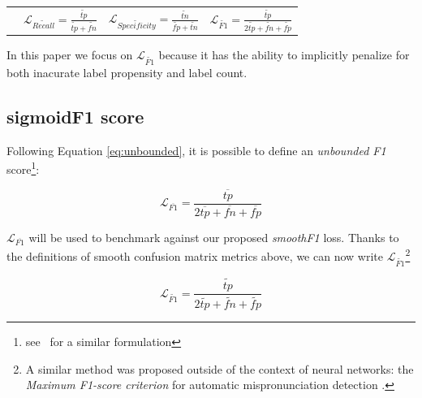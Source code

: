 \begin{table}[]
\begin{tabular}{|c||c|c||c|}
\multicolumn{1}{l|}{} & \multirow{2}{*}{\hspace{1.2em}$\mathcal{L}_{\widetilde{\mathit{Recall}}}= \frac{\widetilde{\mathit{tp}}}{\widetilde{\mathit{tp}} + \widetilde{\mathit{fn}}}$\hspace{1.2em}}& \multirow{2}{*}{$\mathcal{L}_{\widetilde{\mathit{Specificity}}}= \frac{\widetilde{\mathit{tn}}}{\widetilde{\mathit{fp}} + \widetilde{\mathit{tn}}}$} & \multirow{2}{*}{$\mathcal{L}_{\widetilde{\mathit{F1}}}= \frac{\widetilde{\mathit{tp}}}{2 \widetilde{\mathit{tp}}+ \widetilde{\mathit{fn}}+ \widetilde{\mathit{fp}}}$} \\
\multicolumn{1}{l|}{} & & & \\
\cline{2-4}
\end{tabular}%
\end{table}

In this paper we focus on $\mathcal{L}_{\widetilde{\mathit{F1}}}$ because it has the ability to implicitly penalize for both inacurate label propensity and label count.


\subsection{sigmoidF1 score}
\label{sec:orgc5d29d7}

Following Equation \ref{eq:unbounded}, it is possible to define an \emph{unbounded F1} score\footnote{see~\cite{softF1} for a similar formulation}:

\begin{equation}
\mathcal{L}_{\overline{\mathit{F1}}}= \frac{\overline{tp}}{2 \overline{tp}+ \overline{fn}+ \overline{fp}}
\end{equation}

$\mathcal{L}_{\overline{\mathit{F1}}}$ will be used to benchmark against our proposed \emph{smoothF1} loss. Thanks to the definitions of smooth confusion matrix metrics above, we can now write $\mathcal{L}_{\widetilde{\mathit{F1}}}$\footnote{A similar method was proposed outside of the context of neural networks: the \emph{Maximum F1-score criterion} for automatic mispronunciation detection \cite{sigmoid}.}

\begin{equation}\label{eq:sigmoidF1}
\mathcal{L}_{\widetilde{\mathit{F1}}}= \frac{\widetilde{\mathit{tp}}}{2 \widetilde{\mathit{tp}}+ \widetilde{\mathit{fn}}+ \widetilde{\mathit{fp}}}
\end{equation}

